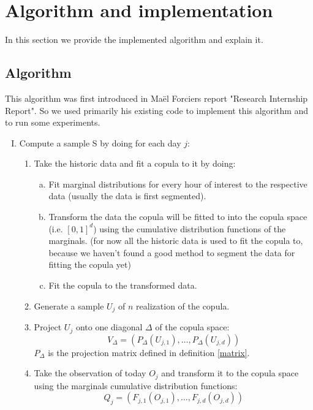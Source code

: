 \section{Algorithm and implementation}\label{alg}

In this section we provide the implemented algorithm and explain it.

\subsection{Algorithm}

This algorithm was first introduced in Ma{\"e}l Forciers report "Research Internship Report". So we used primarily his existing code to implement this algorithm and to run some experiments.

\begin{enumerate}[I.]
	\item Compute a sample S by doing for each day $j$:
	\begin{enumerate}[1.]
		\item Take the historic data and fit a copula to it by doing:
		\begin{enumerate}[(a)]
			\item Fit marginal distributions for every hour of interest to the respective data (usually the data is first segmented).
			\item Transform the data the copula will be fitted to into the copula space (i.e. $[0,1]^d$) using the cumulative distribution functions of the marginals. (for now all the historic data is used to fit the copula to, because we haven't found a good method to segment the data for fitting the copula yet)
			\item Fit the copula to the transformed data.
		\end{enumerate}
		\item Generate a sample $U_{j}$ of $n$ realization of the copula.
		\item Project $U_{j}$ onto one diagonal $\Delta$ of the copula space:
		\begin{equation*}
			V_{\Delta} = (P_{\Delta}(U_{j,1}),\dots,P_{\Delta}(U_{j,d}))
		\end{equation*}
		$P_{\Delta}$ is the projection matrix defined in definition \ref{matrix}.
		\item Take the observation of today $O_{j}$ and transform it to the copula space using the marginals cumulative distribution functions:
		\begin{equation*}
			Q_{j}=(F_{j,1}(O_{j,1}),\dots, F_{j,d}(O_{j,d}))

\end{equation*}
\end{enumerate}
\end{enumerate}
